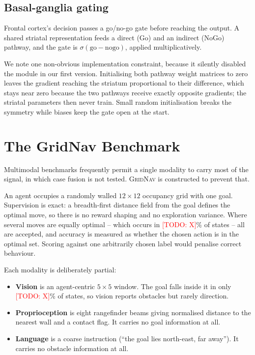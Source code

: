 \documentclass[conference]{IEEEtran}
\newcommand{\todo}[1]{\textcolor{red}{[TODO: #1]}}
\begin{document}
\subsection{Basal-ganglia gating}

Frontal cortex's decision passes a go/no-go gate before reaching the output.
A shared striatal representation feeds a direct (Go) and an indirect (NoGo)
pathway, and the gate is $\sigma(\mathrm{go}-\mathrm{nogo})$, applied
multiplicatively.

We note one non-obvious implementation constraint, because it silently
disabled the module in our first version. Initialising both pathway weight
matrices to zero leaves the gradient reaching the striatum proportional to
their difference, which stays near zero because the two pathways receive
exactly opposite gradients; the striatal parameters then never train. Small
random initialisation breaks the symmetry while biases keep the gate open at
the start.

\section{The GridNav Benchmark}
\label{sec:gridnav}

Multimodal benchmarks frequently permit a single modality to carry most of the
signal, in which case fusion is not tested. \textsc{GridNav} is constructed to
prevent that.

An agent occupies a randomly walled $12\times12$ occupancy grid with one goal.
Supervision is exact: a breadth-first distance field from the goal defines the
optimal move, so there is no reward shaping and no exploration variance. Where
several moves are equally optimal -- which occurs in \todo{X}\% of states --
all are accepted, and accuracy is measured as whether the chosen action is in
the optimal set. Scoring against one arbitrarily chosen label would penalise
correct behaviour.

Each modality is deliberately partial:
\begin{itemize}
  \item \textbf{Vision} is an agent-centric $5\times5$ window. The goal falls
        inside it in only \todo{X}\% of states, so vision reports obstacles but
        rarely direction.
  \item \textbf{Proprioception} is eight rangefinder beams giving normalised
        distance to the nearest wall and a contact flag. It carries no goal
        information at all.
  \item \textbf{Language} is a coarse instruction (``the goal lies north-east,
        far away''). It carries no obstacle information at all.
\end{itemize}
\end{document}
